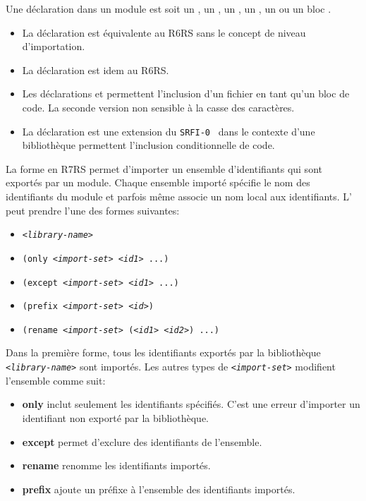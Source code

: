 Une déclaration dans un module est soit un , un ,
un , un , un  ou un
bloc .
\begin{itemize}
  \item La déclaration  est équivalente au R6RS sans le concept
    de niveau d'importation.

  \item La déclaration  est idem au R6RS.

  \item Les déclarations  et  permettent
    l'inclusion d'un fichier en tant qu'un bloc de code.  La seconde version
    non sensible à la casse des caractères.

  \item La déclaration  est une extension du
    \texttt{SRFI-0}~\cite{SRFI-0} dans le contexte d'une bibliothèque
    permettent l'inclusion conditionnelle de code.

\end{itemize}

La forme  en R7RS permet d'importer un ensemble d'identifiants
qui sont exportés par un module. Chaque ensemble importé spécifie le nom des
identifiants du module et parfois même associe un nom local aux identifiants.
L' peut prendre l'une des formes suivantes:
\begin{itemize}
  \label{itm:import-set}
  \item \texttt{\textit{<library-name>}}
  \item \texttt{(only \textit{<import-set>} \textit{<id1>} ...)}
  \item \texttt{(except \textit{<import-set>} \textit{<id1>} ...)}
  \item \texttt{(prefix \textit{<import-set>} \textit{<id>})}
  \item \texttt{(rename \textit{<import-set>} (\textit{<id1>} \textit{<id2>}) ...)}
\end{itemize}


Dans la première forme, tous les identifiants exportés par
la bibliothèque \texttt{\textit{<library-name>}} sont importés.
Les autres types de \texttt{\textit{<import-set>}} modifient
l'ensemble comme suit:
\begin{itemize}
  \item \textbf{only} inclut seulement les identifiants spécifiés. C'est une
    erreur d'importer un identifiant non exporté par la bibliothèque.

  \item \textbf{except} permet d'exclure des identifiants de l'ensemble.

  \item \textbf{rename} renomme les identifiants importés.

  \item \textbf{prefix} ajoute un préfixe à l'ensemble des identifiants
    importés.
\end{itemize}

